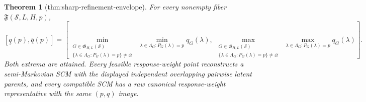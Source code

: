 \documentclass{article}
\newtheorem{theorem}{Theorem}
\begin{document}
\begin{theorem}[thm:sharp-refinement-envelope]\label{thm:sharp-refinement-envelope}
For every nonempty fiber \(\mathfrak F(\mathcal S,L,H,p)\),
\[
[\underline q(p),\overline q(p)]
=\left[
\min_{\substack{G\in\mathfrak G_{H,L}(\mathcal S)\\ \{\lambda\in\Lambda_G:P_G(\lambda)=p\}\ne\varnothing}}\ \min_{\lambda\in\Lambda_G:P_G(\lambda)=p}q_G(\lambda),
\ \max_{\substack{G\in\mathfrak G_{H,L}(\mathcal S)\\ \{\lambda\in\Lambda_G:P_G(\lambda)=p\}\ne\varnothing}}\ \max_{\lambda\in\Lambda_G:P_G(\lambda)=p}q_G(\lambda)
\right].
\]
Both extrema are attained. Every feasible response-weight point reconstructs a semi-Markovian SCM with the displayed independent overlapping pairwise latent parents, and every compatible SCM has a raw canonical response-weight representative with the same \((p,q)\) image.
\end{theorem}
\end{document}
